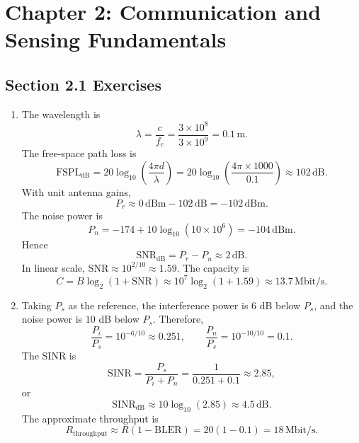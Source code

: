 
\section*{Chapter 2: Communication and Sensing Fundamentals}

\subsection*{Section 2.1 Exercises}

\begin{enumerate}[label=\textbf{\arabic*.}, leftmargin=*]
    \item The wavelength is
    \[
        \lambda=\frac{c}{f_c}=\frac{3\times10^8}{3\times10^9}=0.1\,\mathrm{m}.
    \]
    The free-space path loss is
    \[
        \mathrm{FSPL}_{\mathrm{dB}}
        =
        20\log_{10}\left(\frac{4\pi d}{\lambda}\right)
        =
        20\log_{10}\left(\frac{4\pi\times1000}{0.1}\right)
        \approx 102\,\mathrm{dB}.
    \]
    With unit antenna gains,
    \[
        P_r \approx 0\,\mathrm{dBm}-102\,\mathrm{dB}
        =
        -102\,\mathrm{dBm}.
    \]
    The noise power is
    \[
        P_n=-174+10\log_{10}(10\times10^6)
        =
        -104\,\mathrm{dBm}.
    \]
    Hence
    \[
        \mathrm{SNR}_{\mathrm{dB}}
        =
        P_r-P_n
        \approx 2\,\mathrm{dB}.
    \]
    In linear scale, \(\mathrm{SNR}\approx 10^{2/10}\approx1.59\). The
    capacity is
    \[
        C=B\log_2(1+\mathrm{SNR})
        \approx
        10^7\log_2(1+1.59)
        \approx 13.7\,\mathrm{Mbit/s}.
    \]

    \item Taking \(P_s\) as the reference, the interference power is \(6\) dB
    below \(P_s\), and the noise power is \(10\) dB below \(P_s\). Therefore,
    \[
        \frac{P_i}{P_s}=10^{-6/10}\approx0.251,
        \qquad
        \frac{P_n}{P_s}=10^{-10/10}=0.1.
    \]
    The SINR is
    \[
        \mathrm{SINR}
        =
        \frac{P_s}{P_i+P_n}
        =
        \frac{1}{0.251+0.1}
        \approx2.85,
    \]
    or
    \[
        \mathrm{SINR}_{\mathrm{dB}}\approx10\log_{10}(2.85)\approx4.5\,\mathrm{dB}.
    \]
    The approximate throughput is
    \[
        R_{\mathrm{throughput}}
        \approx R(1-\mathrm{BLER})
        =
        20(1-0.1)
        =
        18\,\mathrm{Mbit/s}.
    \]


\end{enumerate}
